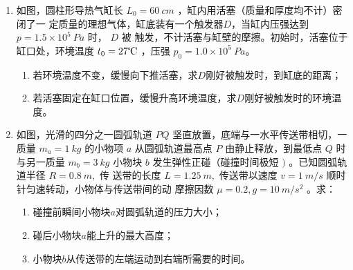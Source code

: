 \begin{enumerate}
\newpage

\gaokaojs


\item 
如图，圆柱形导热气缸长 $L_{0}=60 \ cm$ ，缸内用活塞（质量和厚度均不计）密闭了一
定质量的理想气体，缸底装有一个触发器$ D $，当缸内压强达到 $p=1.5 \times 10^{5} \ Pa$ 时， $D$ 被
触发，不计活塞与缸壁的摩擦。初始时，活塞位于缸口处，环境温度 $t_{0}=27 \celsius $ ，压强
$p_{0}=1.0 \times 10^{5} \ Pa$。
\begin{enumerate}
\item
若环境温度不变，缓慢向下推活塞，求$ D $刚好被触发时，到缸底的距离； 
\item 
若活塞固定在缸口位置，缓慢升高环境温度，求$ D $刚好被触发时的环境温度。






\end{enumerate}
\begin{figure}[h!]
\flushright

\end{figure}








\item 
如图，光滑的四分之一圆弧轨道 $P Q$ 坚直放置，底端与一水平传送带相切，一质量
$m_{a}=1 \ kg$ 的小物项 $a$ 从圆弧轨道最高点 $P$ 由静止释放，到最低点 $Q$ 时与另一质量
$m_{b}=3 \ kg$ 小物块 $b$ 发生弹性正碰（碰撞时间极短 $)$ 。已知圆弧轨道半径 $R=0.8 \ m,$ 传
送带的长度 $L=1.25 \ m,$ 传送带以速度 $v=1 \ m/s$ 顺时针匀速转动，小物体与传送带间的动
摩擦因数 $\mu=0.2, g=10 \ m/s^{2}$ 。求：
\begin{enumerate}
\item
碰撞前瞬间小物块$ a $对圆弧轨道的压力大小； 
\item 
碰后小物块$ a $能上升的最大高度； 
\item 
小物块$ b $从传送带的左端运动到右端所需要的时间。






\end{enumerate}
\begin{figure}[h!]
\flushright

\end{figure}


\end{enumerate}
